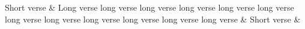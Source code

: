 \documentclass{scrbook}
\begin{document}
\vspace*{41\baselineskip}
\beginnumbering
\stanza
   Short verse &
   Long verse long verse long verse long verse 
   long verse long verse long verse long verse 
   long verse long verse long verse long verse &
   Short verse
\&
\endnumbering
\end{document}
